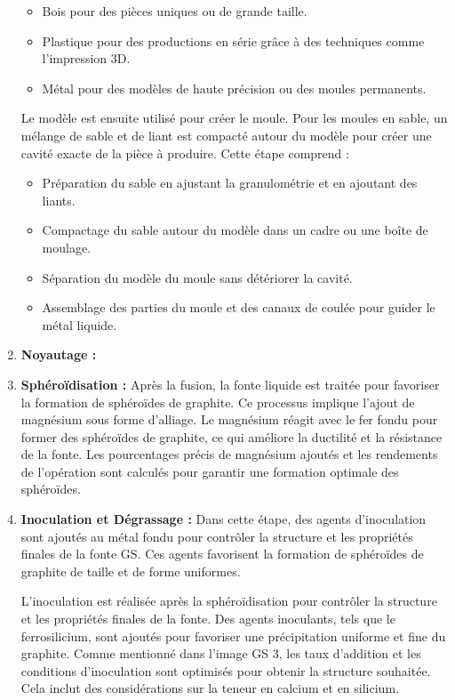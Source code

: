\documentclass[12pt]{article}
\begin{document}
\begin{enumerate}
\begin{itemize}
    \item Bois pour des pièces uniques ou de grande taille.
    \item Plastique pour des productions en série grâce à des techniques comme l'impression 3D.
    \item Métal pour des modèles de haute précision ou des moules permanents.
\end{itemize}


Le modèle est ensuite utilisé pour créer le moule. Pour les moules en sable,
un mélange de sable et de liant est compacté autour du modèle pour créer 
une cavité exacte de la pièce à produire. Cette étape comprend :

\begin{itemize}
    \item Préparation du sable en ajustant la granulométrie et en ajoutant des liants.
    \item Compactage du sable autour du modèle dans un cadre ou une boîte de moulage.
    \item Séparation du modèle du moule sans détériorer la cavité.
    \item Assemblage des parties du moule et des canaux de coulée pour guider le métal liquide.
\end{itemize}


    \item \textbf{Noyautage :} 


    \item \textbf{Sphéroïdisation :} Après la fusion, la fonte liquide est traitée 
    pour favoriser la formation de sphéroïdes de graphite. Ce processus implique 
    l'ajout de magnésium sous forme d'alliage. Le magnésium réagit avec le fer fondu 
    pour former des sphéroïdes de graphite, ce qui améliore la ductilité et la 
    résistance de la fonte. Les pourcentages précis de magnésium ajoutés et les 
    rendements de l'opération sont calculés pour garantir une formation optimale 
    des sphéroïdes.
    \item \textbf{Inoculation et Dégrassage :} Dans cette étape, des agents d'inoculation sont 
    ajoutés au métal fondu pour contrôler la structure et les propriétés finales de 
    la fonte GS. Ces agents favorisent la formation de sphéroïdes de graphite de 
    taille et de forme uniformes.

    L'inoculation est réalisée après la sphéroïdisation pour contrôler la structure 
    et les propriétés finales de la fonte. Des agents inoculants, tels que le 
    ferrosilicium, sont ajoutés pour favoriser une précipitation uniforme et fine 
    du graphite. Comme mentionné dans l'image GS 3, les taux d'addition et les 
    conditions d'inoculation sont optimisés pour obtenir la structure souhaitée. 
    Cela inclut des considérations sur la teneur en calcium et en silicium.


\end{enumerate}
\end{document}
